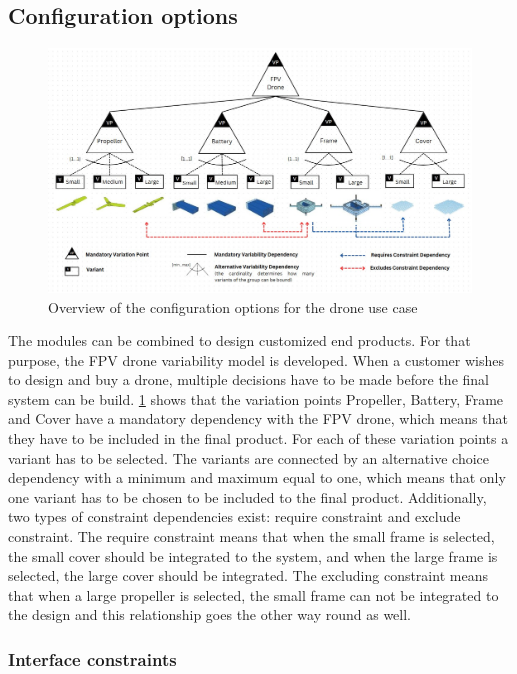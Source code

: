 \documentclass[sigconf,review]{acmart}
\begin{document}
\subsection{Configuration options}
\label{sec:configuration-options}


\begin{figure}[htbp]
    \includegraphics[width=\textwidth]{./FeatureTreeWithLegend3.jpg}
    \caption{Overview of the configuration options for the drone use case}
    \label{fig:feature-tree}
\end{figure}

The modules can be combined to design customized end products.  
For that purpose, the FPV drone variability model is developed. 
When a customer wishes to design and buy a drone, multiple decisions have to be made before the final system can be build. 
\cref{fig:feature-tree} shows that the variation points Propeller, Battery, Frame and Cover have a mandatory dependency with the FPV drone, which means that they have to be included in the final product. 
For each of these variation points a variant has to be selected. 
The variants are connected by an alternative choice dependency with a minimum and maximum equal to one, which means that only one variant has to be chosen to be included to the final product. 
Additionally, two types of constraint dependencies exist: require constraint and exclude constraint. 
The require constraint means that when the small frame is selected, the small cover should be integrated to the system, and when the large frame is selected, the large cover should be integrated. 
The excluding constraint means that when a large propeller is selected, the small frame can not be integrated to the design and this relationship goes the other way round as well.

\subsubsection{Interface constraints}
\end{document}
